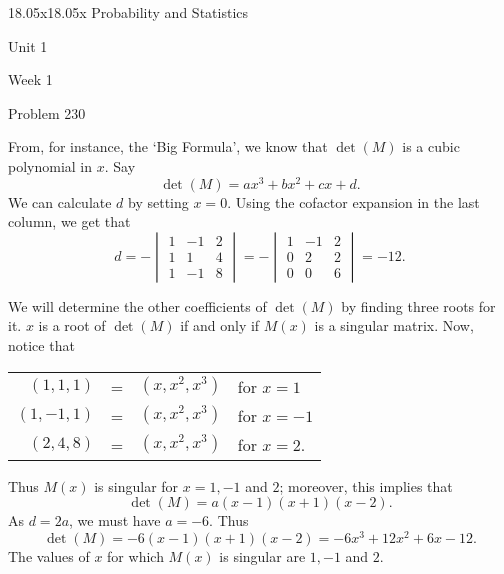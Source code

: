 \begin{edXcourse}{18.05x}{18.05x Probability and Statistics}
\begin{edXchapter}{Unit 1}
\begin{edXsection}{Week 1}
\begin{edXsequential}
\begin{edXproblem}{Problem 2}{30}
\begin{enumerate}
\begin{sol}
From, for instance, the `Big Formula', we know that $\det(M)$ is a cubic polynomial in $x$. Say
$$
\det(M) = a x^3 + b x^2 + cx +d.
$$
We can calculate $d$ by setting $x=0$. Using the cofactor expansion in the last column, we get that
$$
d = -
\begin{vmatrix}
1 & -1 & 2 \\
1 & 1 & 4 \\
1 & -1 & 8 
\end{vmatrix}
= -
\begin{vmatrix}
1 & -1 & 2 \\
0 & 2 & 2 \\
0  & 0 & 6
\end{vmatrix}
= -12.
$$

We will determine the other coefficients of $\det(M)$ by finding three roots for it. $x$ is a root of $\det(M)$ if and only if $M(x)$ is a singular matrix. Now, notice that 

\begin{center}
\begin{tabular}{rccl}
$(1, 1, 1)$ & = & $(x,x^2, x^3)$ &  for $x=1$ \\
$(1, -1, 1)$ & = & $(x,x^2, x^3)$ & for $x=-1$ \\
$(2, 4, 8 )$ & = & $(x,x^2, x^3)$ & for $x=2$. \\
\end{tabular}
\end{center}
Thus $M(x)$ is singular for $x=1, -1$ and $2$; moreover, this implies that $$\det(M) = a (x-1)(x+1)(x-2).$$
As $d = 2a$, we must have $a =-6$. Thus
$$
\det(M) =  -6(x-1)(x+1)(x-2) = -6 x^3 +12x^2 + 6x - 12.
$$
The values of $x$ for which $M(x)$ is singular are $1, -1$ and $2$.
\newline


\end{sol}
\end{enumerate}
\end{edXproblem}
\end{edXsequential}
\end{edXsection}
\end{edXchapter}
\end{edXcourse}
